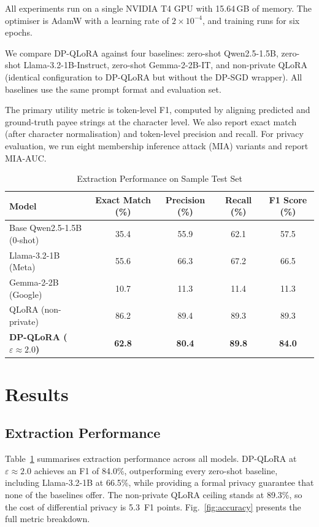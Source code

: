 \documentclass[conference]{IEEEtran}
\begin{document}
All experiments run on a single NVIDIA T4 GPU with 15.64\,GB of memory. The optimiser is AdamW with a learning rate of $2 \times 10^{-4}$, and training runs for six epochs.

We compare DP-QLoRA against four baselines: zero-shot Qwen2.5-1.5B, zero-shot Llama-3.2-1B-Instruct, zero-shot Gemma-2-2B-IT, and non-private QLoRA (identical configuration to DP-QLoRA but without the DP-SGD wrapper). All baselines use the same prompt format and evaluation set.

The primary utility metric is token-level F1, computed by aligning predicted and ground-truth payee strings at the character level. We also report exact match (after character normalisation) and token-level precision and recall. For privacy evaluation, we run eight membership inference attack (MIA) variants and report MIA-AUC.

\begin{table}[!ht]
\caption{Extraction Performance on Sample Test Set}
\label{tab:perf}
\centering
\begin{tabular}{@{}lcccc@{}}
\toprule
\textbf{Model} &
\textbf{Exact Match (\%)} &
\textbf{Precision (\%)} &
\textbf{Recall (\%)} &
\textbf{F1 Score (\%)} \\
\midrule
Base Qwen2.5-1.5B (0-shot) & 35.4 & 55.9 & 62.1 & 57.5 \\
Llama-3.2-1B (Meta)        & 55.6 & 66.3 & 67.2 & 66.5 \\
Gemma-2-2B (Google)        & 10.7 & 11.3 & 11.4 & 11.3 \\
QLoRA (non-private)        & 86.2 & 89.4 & 89.3 & 89.3 \\
\textbf{DP-QLoRA ($\varepsilon{\approx}2.0$)} &
\textbf{62.8} &
\textbf{80.4} &
\textbf{89.8} &
\textbf{84.0} \\
\bottomrule
\end{tabular}
\end{table}


\section{Results}
\label{sec:results}

\subsection{Extraction Performance}

Table~\ref{tab:perf} summarises extraction performance across all models. DP-QLoRA at $\varepsilon \approx 2.0$ achieves an F1 of 84.0\%, outperforming every zero-shot baseline, including Llama-3.2-1B at 66.5\%, while providing a formal privacy guarantee that none of the baselines offer. The non-private QLoRA ceiling stands at 89.3\%, so the cost of differential privacy is 5.3~F1 points. Fig.~\ref{fig:accuracy} presents the full metric breakdown.
\end{document}
